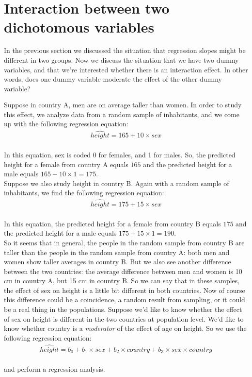 \documentclass[]{book}\usepackage[]{graphicx}\usepackage[]{color}
\begin{document}
\section{Interaction between two dichotomous variables}

In the previous section we discussed the situation that regression slopes might be different in two groups. Now we discuss the situation that we have two dummy variables, and that we're interested whether there is an interaction effect. In other words, does one dummy variable moderate the effect of the other dummy variable?

Suppose in country A, men are on average taller than women. In order to study this effect, we analyze data from a random sample of inhabitants, and we come up with the following regression equation:
\\
\begin{eqnarray} 
\widehat{height} = 165 + 10  \times sex  \nonumber
\end{eqnarray}
\\
In this equation, sex is coded 0 for females, and 1 for males. So, the predicted height for a female from country A equals $165$ and the predicted height for a male equals $165 + 10 \times 1 = 175$.\\


Suppose we also study height in country B. Again with a random sample of inhabitants, we find the following regression equation:
\\
\begin{eqnarray} 
\widehat{height} = 175 + 15  \times sex  \nonumber
\end{eqnarray}
\\
In this equation, the predicted height for a female from country B equals $175$ and the predicted height for a male equals $175 + 15 \times 1 = 190$.\\

So it seems that in general, the people in the random sample from country B are taller than the people in the random sample from country A: both men and women show taller averages in country B. But we also see another difference between the two countries: the average difference between men and women is 10 cm in country A, but 15 cm in country B. So we can say that in these samples, the effect of sex on height is a little bit different in both countries. Now of course this difference could be a coincidence, a random result from sampling, or it could be a real thing in the populations. Suppose we'd like to know whether the effect of sex on height is different in the two countries at population level. We'd like to know whether country is a \textit{moderator} of the effect of age on height. So we use the following regression equation:
\\
\begin{eqnarray} 
\widehat{height} = b_0 + b_1  \times sex + b_2 \times country +  b_3 \times sex \times country  \nonumber
\end{eqnarray}
\\
and perform a regression analysis. 
\end{document}
